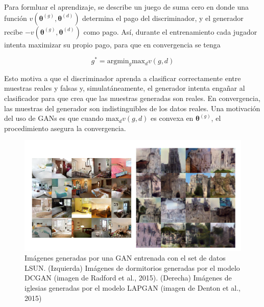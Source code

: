 Para formluar el aprendizaje, se describe un juego de suma cero en donde una funci\'on $v(\bm{\theta}^{(g)},\bm{\theta}^{(d)})$ determina el pago del discriminador, y el generador recibe $-v(\bm{\theta}^{(g)},\bm{\theta}^{(d)})$ como pago. As\'i, durante el entrenamiento cada jugador intenta maximizar su propio pago, para que en convergencia se tenga

\begin{equation}
g^{*} = \textrm{arg} \textrm{min}_{g} \textrm{max}_{d} v(g,d)
\end{equation}

Esto motiva a que el discriminador aprenda a clasificar correctamente entre muestras reales y falsas y, simulat\'aneamente, el generador intenta enga{\~{n}}ar al clasificador para que crea que las muestras generadas son reales. En convergencia, las muestras del generador son indistinguibles de los datos reales. Una motivaci\'on del uso de GANs es que cuando $\textrm{max}_{d} v(g,d)$ es convexa en $\bm{\theta}^{(g)}$, el procedimiento asegura la convergencia.

\begin{figure}[H]
\captionsetup{font=small,labelfont=small}
\caption{Im\'agenes generadas por una GAN entrenada con el set de datos LSUN. (Izquierda) Im\'agenes de dormitorios generadas por el modelo DCGAN (imagen de Radford et al., 2015). (Derecha) Im\'agenes de iglesias generadas por el modelo LAPGAN (imagen de Denton et al., 2015)}
\centering
\includegraphics[scale=.75]{img/gans.PNG}
\end{figure}